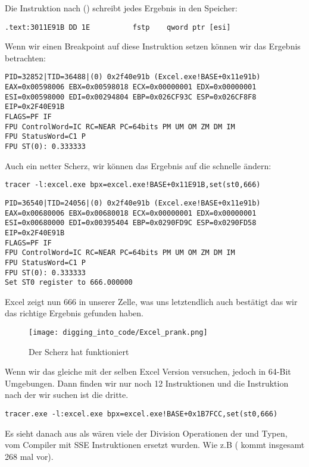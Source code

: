 Die Instruktion nach \FDIV () schreibt jedes Ergebnis in den Speicher:\\

\begin{lstlisting}[style=customasmx86]
.text:3011E91B DD 1E          fstp    qword ptr [esi]
\end{lstlisting}

Wenn wir einen Breakpoint auf diese Instruktion setzen k\"onnen wir das Ergebnis betrachten:

\begin{lstlisting}
PID=32852|TID=36488|(0) 0x2f40e91b (Excel.exe!BASE+0x11e91b)
EAX=0x00598006 EBX=0x00598018 ECX=0x00000001 EDX=0x00000001
ESI=0x00598000 EDI=0x00294804 EBP=0x026CF93C ESP=0x026CF8F8
EIP=0x2F40E91B
FLAGS=PF IF
FPU ControlWord=IC RC=NEAR PC=64bits PM UM OM ZM DM IM 
FPU StatusWord=C1 P 
FPU ST(0): 0.333333
\end{lstlisting}

Auch ein netter Scherz, wir k\"onnen das Ergebnis auf die schnelle \"andern:

\begin{lstlisting}
tracer -l:excel.exe bpx=excel.exe!BASE+0x11E91B,set(st0,666)
\end{lstlisting}

\begin{lstlisting}
PID=36540|TID=24056|(0) 0x2f40e91b (Excel.exe!BASE+0x11e91b)
EAX=0x00680006 EBX=0x00680018 ECX=0x00000001 EDX=0x00000001
ESI=0x00680000 EDI=0x00395404 EBP=0x0290FD9C ESP=0x0290FD58
EIP=0x2F40E91B
FLAGS=PF IF
FPU ControlWord=IC RC=NEAR PC=64bits PM UM OM ZM DM IM 
FPU StatusWord=C1 P 
FPU ST(0): 0.333333
Set ST0 register to 666.000000
\end{lstlisting}

Excel zeigt nun 666 in unserer Zelle, was uns letztendlich auch best\"atigt das wir das richtige Ergebnis gefunden haben.

\begin{figure}[H]
\centering
\texttt{[image: digging\_into\_code/Excel\_prank.png]}
\caption{Der Scherz hat funktioniert}
\end{figure}

Wenn wir das gleiche mit der selben Excel Version versuchen, jedoch in 64-Bit Umgebungen.
Dann finden wir nur noch 12 \FDIV Instruktionen und die Instruktion nach der wir suchen ist
die dritte. 

\begin{lstlisting}
tracer.exe -l:excel.exe bpx=excel.exe!BASE+0x1B7FCC,set(st0,666)
\end{lstlisting}


Es sieht danach aus als w\"aren viele der Division Operationen der \Tfloat und \Tdouble Typen, vom Compiler mit SSE Instruktionen ersetzt wurden.
Wie z.B  ( kommt insgesamt 268 mal vor).
